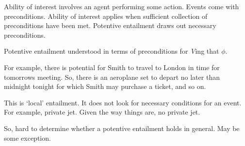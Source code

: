 \begin{note}
  Ability of interest involves an agent performing some action.
  Events come with preconditions.
  Ability of interest applies when sufficient collection of preconditions have been met.
  Potentive entailment draws out necessary preconditions.

  Potentive entailment understood in terms of preconditions for \emph{V}ing that \(\phi\).
\end{note}

\begin{note}
  For example, there is potential for Smith to travel to London in time for tomorrows meeting.
  So, there is an aeroplane set to depart no later than midnight tonight for which Smith may purchase a ticket, and so on.

  This is `local' entailment.
  It does not look for necessary conditions for an event.
  For example, private jet.
  Given the way things are, no private jet.

  So, hard to determine whether a potentive entailment holds in general.
  May be some exception.
\end{note}

